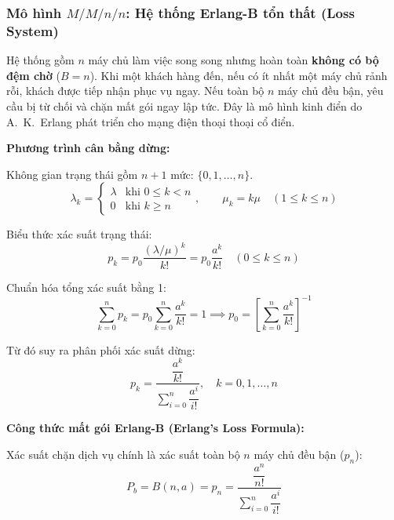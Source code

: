 \newpage
\subsubsection{Mô hình \texorpdfstring{$M/M/n/n$}{M/M/n/n}: Hệ thống Erlang-B tổn thất (Loss System)}

\hspace{0.5cm}Hệ thống gồm $n$ máy chủ làm việc song song nhưng hoàn toàn \textbf{không có bộ đệm chờ} ($B = n$). Khi một khách hàng đến, nếu có ít nhất một máy chủ rảnh rỗi, khách được tiếp nhận phục vụ ngay. Nếu toàn bộ $n$ máy chủ đều bận, yêu cầu bị từ chối và chặn mất gói ngay lập tức. Đây là mô hình kinh điển do A.~K.~Erlang phát triển cho mạng điện thoại thoại cổ điển.

\textbf{Phương trình cân bằng dừng:}

Không gian trạng thái gồm $n+1$ mức: $\{0, 1, \dots, n\}$.
\begin{equation}
    \lambda_k = \begin{cases} \lambda & \text{khi } 0 \le k < n \\ 0 & \text{khi } k \ge n \end{cases}, \qquad \mu_k = k\mu \quad (1 \le k \le n)
\end{equation}

Biểu thức xác suất trạng thái:
\begin{equation}
    p_k = p_0 \frac{(\lambda/\mu)^k}{k!} = p_0 \frac{a^k}{k!} \quad (0 \le k \le n)
\end{equation}

Chuẩn hóa tổng xác suất bằng 1:
\begin{equation}
    \sum_{k=0}^n p_k = p_0 \sum_{k=0}^n \frac{a^k}{k!} = 1 \implies p_0 = \left[ \sum_{k=0}^n \frac{a^k}{k!} \right]^{-1}
\end{equation}

Từ đó suy ra phân phối xác suất dừng:
\begin{equation}
    p_k = \frac{\dfrac{a^k}{k!}}{\displaystyle\sum_{i=0}^n \dfrac{a^i}{i!}}, \quad k = 0, 1, \dots, n
\end{equation}

\textbf{Công thức mất gói Erlang-B (Erlang's Loss Formula):}

Xác suất chặn dịch vụ chính là xác suất toàn bộ $n$ máy chủ đều bận ($p_n$):
\begin{equation}
    P_b = B(n, a) = p_n = \frac{\dfrac{a^n}{n!}}{\displaystyle\sum_{i=0}^n \dfrac{a^i}{i!}}
    \label{eq:erlang-b-formula}
\end{equation}

